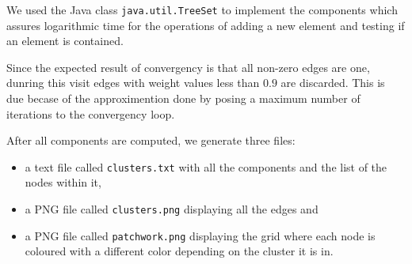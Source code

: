 We used the Java class \verb!java.util.TreeSet! to implement
the components which assures logarithmic time for
the operations of adding a new element and testing if an element
is contained. 

Since the expected result of convergency is that all non-zero edges
are one, dunring this visit edges with weight values less than $0.9$
are discarded. This is due becase of the approximention done by
posing a maximum number of iterations to the convergency loop.

After all components are computed, we generate three files:
\begin{itemize}
\item a text file called \verb!clusters.txt! with all the components and
the list of the nodes within it,
\item a PNG file called \verb!clusters.png! displaying all the edges and
\item a PNG file called \verb!patchwork.png! displaying the grid where
each node is coloured with a different color depending on the cluster it
is in.
\end{itemize}


